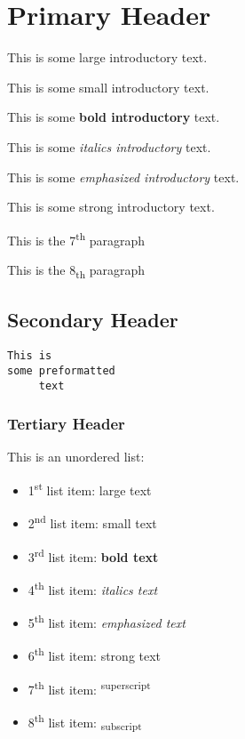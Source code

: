 \documentclass[12pt]{article}
\begin{document}
\section{Primary Header}This is some {\Large large introductory} text.

This is some {\scriptsize small introductory} text.

This is some \textbf{bold introductory} text.

This is some \textit{italics introductory} text.

This is some \emph{emphasized introductory} text.

This is some \textmd{strong introductory} text.

This is the 7\textsuperscript{th} paragraph

This is the 8\textsubscript{th} paragraph

\subsection{Secondary Header}\begin{verbatim}This is
some preformatted
     text\end{verbatim}
\subsubsection{Tertiary Header}This is an unordered list:

\begin{itemize}
    \item 1\textsuperscript{st} list item: {\Large large text}

    \item 2\textsuperscript{nd} list item: {\scriptsize small text}

    \item 3\textsuperscript{rd} list item: \textbf{bold text}

    \item 4\textsuperscript{th} list item: \textit{italics text}

    \item 5\textsuperscript{th} list item: \emph{emphasized text}

    \item 6\textsuperscript{th} list item: \textmd{strong text}

    \item 7\textsuperscript{th} list item: \textsuperscript{superscript}

    \item 8\textsuperscript{th} list item: \textsubscript{subscript}

\end{itemize}
\end{document}
